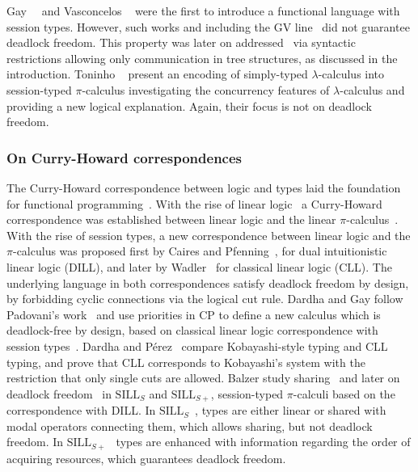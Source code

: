 \documentclass[main.tex]{subfiles}
\begin{document}
Gay~\etal~\cite{gaynagarajan03} and Vasconcelos \etal~\cite{vasconcelosravara04,vasconcelosgay06} were the first to introduce a functional language with session types. However, such works and including the GV line~\cite{gayvasconcelos10,gayvasconcelos12} did not guarantee deadlock freedom. This property was later on addressed~\cite{lindleymorris15,wadler15} via syntactic restrictions allowing only communication in tree structures, as discussed in the introduction. Toninho \etal~\cite{toninhocaires12} present an encoding of simply-typed $\lambda$-calculus into session-typed $\pi$-calculus investigating the concurrency features of $\lambda$-calculus and providing a new logical explanation. Again, their focus is not on deadlock freedom.


\subsubsection*{On Curry-Howard correspondences}
The Curry-Howard correspondence between logic and types laid the foundation for functional programming~\cite{wadler15}. With the rise of linear logic~\cite{girard87} a Curry-Howard correspondence was established between linear logic and the linear $\pi$-calculus~\cite{abramsky94,bellinscott94}. With the rise of session types, a new correspondence between linear logic and the $\pi$-calculus was proposed first by Caires and Pfenning~\cite{cairespfenning10}, for dual intuitionistic linear logic (DILL), and later by Wadler~\cite{wadler15} for classical linear logic (CLL). The underlying language in both correspondences satisfy deadlock freedom by design, by forbidding cyclic connections via the logical cut rule. Dardha and Gay follow Padovani's work~\cite{padovani14} and use priorities in CP to define a new calculus which is deadlock-free by design, based on classical linear logic correspondence with session types~\cite{wadler12}. Dardha and P\'{e}rez~\cite{dardhaperez15} compare Kobayashi-style typing and CLL typing, and prove that CLL corresponds to Kobayashi's system with the restriction that only single cuts are allowed. Balzer \etal study sharing~\cite{balzerpfenning17} and later on deadlock freedom~\cite{balzertoninho19} in $\text{SILL}_S$ and $\text{SILL}_{S+}$, session-typed $\pi$-calculi based on the correspondence with DILL. In $\text{SILL}_S$~\cite{balzerpfenning17}, types are either linear or shared with modal operators connecting them, which allows sharing, but not deadlock freedom. In $\text{SILL}_{S+}$~\cite{balzertoninho19} types are enhanced with information regarding the order of acquiring resources, which guarantees deadlock freedom.
\end{document}
